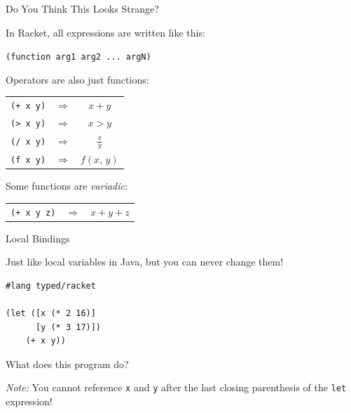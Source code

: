 \documentclass{beamer}
\begin{document}
\begin{frame}[fragile]{Do You Think This Looks Strange?}

  In Racket, all expressions are written like this:

  \begin{center}
    \lstinline{(function arg1 arg2 ... argN)}
  \end{center}

  \pause{}

  Operators are also just functions:

  \begin{center}
    \begin{tabular}{ccc}
      \lstinline{(+ x y)} & $\Rightarrow$ & $x + y$ \\
      \lstinline{(> x y)} & $\Rightarrow$ & $x > y$ \\
      \lstinline{(/ x y)} & $\Rightarrow$ & $\frac{x}{y}$ \\
      \lstinline{(f x y)} & $\Rightarrow$ & $f(x, \, y)$
    \end{tabular}
  \end{center}

  \pause{}

  Some functions are \textit{variadic}:

  \begin{center}
    \begin{tabular}{ccc}
      \lstinline{(+ x y z)} & $\Rightarrow$ & $x + y + z$
    \end{tabular}
  \end{center}

\end{frame}

\begin{frame}[fragile]{Local Bindings}

Just like local variables in Java, but you can never change them!

\begin{lstlisting}
#lang typed/racket

(let ([x (* 2 16)]
      [y (* 3 17)])
    (+ x y))
\end{lstlisting}

What does this program do?

\vspace{1cm}

\textit{Note:} You cannot reference \lstinline{x} and \lstinline{y} after the last closing parenthesis of the \lstinline{let} expression!

\end{frame}
\end{document}
